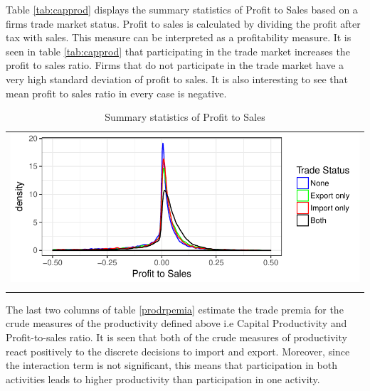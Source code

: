 \documentclass[11pt]{article}
\begin{document}
Table \ref{tab:capprod} displays the summary statistics of Profit to Sales based on a
firms trade market status. Profit to sales is calculated by dividing
the profit after tax with sales. This measure can be interpreted as a
profitability measure. It is seen in table \ref{tab:capprod} that participating in
the trade market increases the profit to sales ratio. Firms that do
not participate in the trade market have a very high standard
deviation of profit to sales. It is also interesting to see that mean
profit to sales ratio in every case is negative. 
\begin{center}
\begin{table}[htp]
\caption{Summary statistics of Profit to Sales}
\begin{tabular}{c}
 \includegraphics{./PICS/denspatsales.pdf}   \\ 
   \\  
\end{tabular}
\end{table}
\end{center}
 
The last two columns of table \ref{prodrpemia} estimate the trade
premia for the crude measures of the productivity defined above i.e
Capital Productivity and Profit-to-sales ratio. It is seen that both
of the crude measures of productivity react positively to the discrete
decisions to import and export. Moreover, since the interaction term
is not significant, this means that participation in both activities
leads to higher productivity than participation in one activity. 
\end{document}
